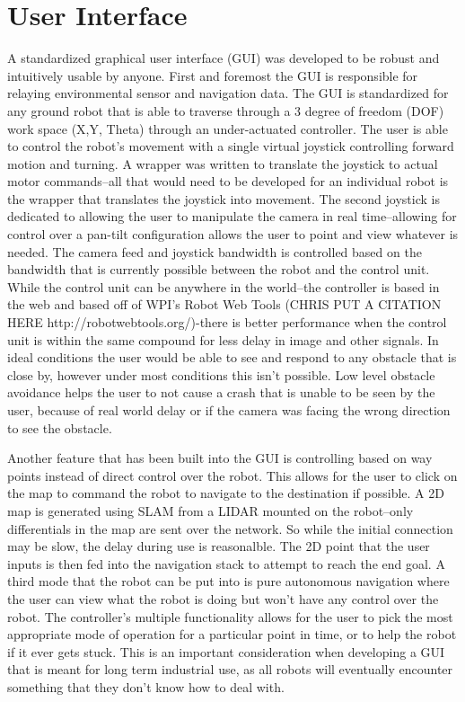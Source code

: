 \section{User Interface}\label{sec:ui}

A standardized graphical user interface (GUI) was developed to be robust and intuitively usable by anyone. First and foremost the GUI is responsible for relaying environmental sensor and navigation data. The GUI is standardized for any ground robot that is able to traverse through a 3 degree of freedom (DOF) work space (X,Y, Theta) through an under-actuated controller. The user is able to control the robot's movement with a single virtual joystick controlling forward motion and turning. A wrapper was written to translate the joystick to actual motor commands--all that would need to be developed for an individual robot is the wrapper that translates the joystick into movement. The second joystick is dedicated to allowing the user to manipulate the camera in real time--allowing for control over a pan-tilt configuration allows the user to point and view whatever is needed. The camera feed and joystick bandwidth is controlled based on the bandwidth that is currently possible between the robot and the control unit. While the control unit can be anywhere in the world--the controller is based in the web and based off of WPI's Robot Web Tools (CHRIS PUT A CITATION HERE http://robotwebtools.org/)-there is better performance when the control unit is within the same compound for less delay in image and other signals. In ideal conditions the user would be able to see and respond to any obstacle that is close by, however under most conditions this isn't possible. Low level obstacle avoidance helps the user to not cause a crash that is unable to be seen by the user, because of real world delay or if the camera was facing the wrong direction to see the obstacle.

Another feature that has been built into the GUI is controlling based on way points instead of direct control over the robot. This allows for the user to click on the map to command the robot to navigate to the destination if possible. A 2D map is generated using SLAM from a LIDAR mounted on the robot--only differentials in the map are sent over the network. So while the initial connection may be slow, the delay during use is reasonalble. The 2D point that the user inputs is then fed into the navigation stack to attempt to reach the end goal. A third mode that the robot can be put into is pure autonomous navigation where the user can view what the robot is doing but won't have any control over the robot. The controller's multiple functionality allows for the user to pick the most appropriate mode of operation for a particular point in time, or to help the robot if it ever gets stuck. This is an important consideration when developing a GUI that is meant for long term industrial use, as all robots will eventually encounter something that they don't know how to deal with. 